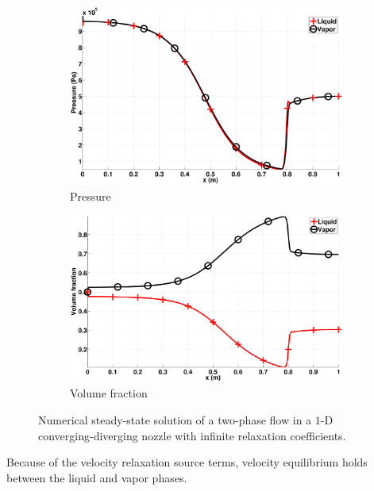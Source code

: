 \documentclass[preprint,10pt]{elsarticle}
\begin{document}
\begin{figure}[H]
        \begin{subfigure}[b]{0.495\textwidth}
                \centering
                \includegraphics[width=\textwidth]{figures/nozzle-aint-1e4_two_phases_pressure.eps}
                \caption{Pressure}
                \label{fig:nozzle-aint-1e4-press}
        \end{subfigure}        
        \begin{subfigure}[b]{0.495\textwidth}
                \centering
                \includegraphics[width=\textwidth]{figures/nozzle-aint-1e4_two_phases_volume_fraction.eps}
                \caption{Volume fraction}
                \label{fig:nozzle-aint-1e4-vf}
        \end{subfigure}
        \caption{Numerical steady-state solution of a two-phase flow in a $1$-D converging-diverging nozzle with infinite relaxation coefficients.}\label{fig:nozzle-aint-1e4-variables}
\end{figure}
%
Because of the velocity relaxation source terms, velocity equilibrium holds between the liquid and vapor phases. 
\end{document}

